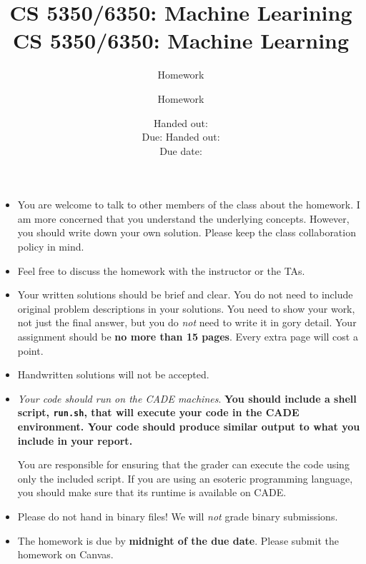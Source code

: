 \documentclass[12pt, fullpage,letterpaper]{article}
\title{CS 5350/6350: Machine Learining \semester}
\author{Homework \assignmentId}
\date{Handed out: \releaseDate\\
	Due: \dueDate}
\title{CS 5350/6350: Machine Learning \semester}
\author{Homework \assignmentId}
\date{Handed out: \releaseDate\\
  Due date: \dueDate}
\begin{document}
\maketitle


\newcommand{\Hcal}{\mathcal{H}} 
{\footnotesize
	\begin{itemize}
		\item You are welcome to talk to other members of the class about
		the homework. I am more concerned that you understand the
		underlying concepts. However, you should write down your own
		solution. Please keep the class collaboration policy in mind.
		
		\item Feel free to discuss the homework with the instructor or the TAs.
		
		\item Your written solutions should be brief and clear. You do not need to include original problem descriptions in your solutions. You need to
		show your work, not just the final answer, but you do \emph{not}
		need to write it in gory detail. Your assignment should be {\bf no
			more than 15 pages}. Every extra page will cost a point.
		
		\item Handwritten solutions will not be accepted.
		
		
		\item {\em Your code should run on the CADE machines}. \textbf{You should
		include a shell script, {\tt run.sh}, that will execute your code
		in the CADE environment. Your code should produce similar output to what you include in your report.}
		
		You are responsible for ensuring that the grader can execute the
		code using only the included script. If you are using an
		esoteric programming language, you should make sure that its
		runtime is available on CADE.
		
		\item Please do not hand in binary files! We will {\em not} grade
		binary submissions.
		
		\item The homework is due by \textbf{midnight of the due date}. Please submit
		the homework on Canvas.
		
	\end{itemize}
}
\end{document}
